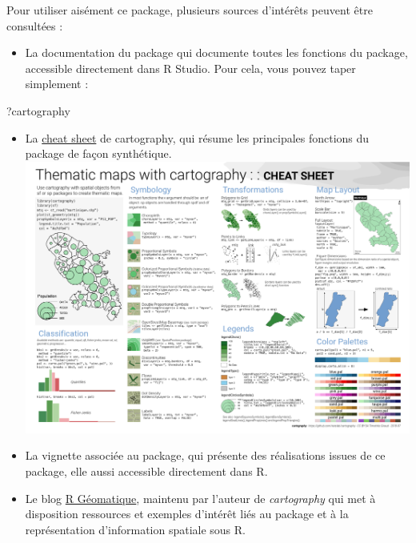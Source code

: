 \documentclass[]{book}
\newenvironment{Shaded}{\begin{snugshade}}{\end{snugshade}}
\newcommand{\NormalTok}[1]{#1}
\providecommand{\tightlist}{%
  \setlength{\itemsep}{0pt}\setlength{\parskip}{0pt}}
\begin{document}
Pour utiliser aisément ce package, plusieurs sources d'intérêts peuvent
être consultées :

\begin{itemize}
\tightlist
\item
  La documentation du package qui documente toutes les fonctions du
  package, accessible directement dans R Studio. Pour cela, vous pouvez
  taper simplement :
\end{itemize}

\begin{Shaded}
\begin{Highlighting}[]
\NormalTok{?cartography}
\end{Highlighting}
\end{Shaded}

\begin{itemize}
\item
  La
  \href{http://riatelab.github.io/cartography/vignettes/cheatsheet/cartography_cheatsheet.pdf}{cheat
  sheet} de cartography, qui résume les principales fonctions du package
  de façon synthétique.
  \href{http://riatelab.github.io/cartography/vignettes/cheatsheet/cartography_cheatsheet.pdf}{\includegraphics{img/cheat_sheet.png}}
\item
  La vignette associée au package, qui présente des réalisations issues
  de ce package, elle aussi accessible directement dans R.
\item
  Le blog \href{https://rgeomatic.hypotheses.org/}{R Géomatique},
  maintenu par l'auteur de \emph{cartography} qui met à disposition
  ressources et exemples d'intérêt liés au package et à la
  représentation d'information spatiale sous R.
\end{itemize}
\end{document}
